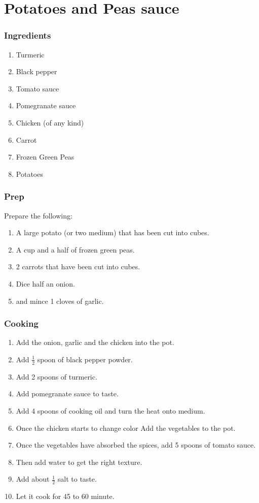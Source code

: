 \section{Potatoes and Peas sauce}
\subsubsection{Ingredients}
\begin{enumerate}
    \item Turmeric
    \item Black pepper
    \item Tomato sauce
    \item Pomegranate sauce
    \item Chicken (of any kind)
    \item Carrot
    \item Frozen Green Peas
    \item Potatoes
\end{enumerate}

\subsubsection{Prep}
Prepare the following:
\begin{enumerate}
    \item A large potato (or two medium) that has been cut into cubes.
    \item A cup and a half of frozen green peas.
    \item 2 carrots that have been cut into cubes.
    \item Dice half an onion.
    \item and mince 1 cloves of garlic.
\end{enumerate}

\subsubsection{Cooking}
\begin{enumerate}
    \item Add the onion, garlic and the chicken into the pot.
    \item Add $\frac{1}{2}$ spoon of black pepper powder.
    \item Add 2 spoons of turmeric.
    \item Add pomegranate sauce to taste.
    \item Add 4 spoons of cooking oil and turn the heat onto medium.
    \item Once the chicken starts to change color Add the vegetables to the pot.
    \item Once the vegetables have absorbed the spices, add 5 spoons of tomato sauce.
    \item Then add water to get the right texture.
    \item Add about $\frac{1}{2}$ salt to taste.
    \item Let it cook for 45 to 60 minute.
\end{enumerate}


